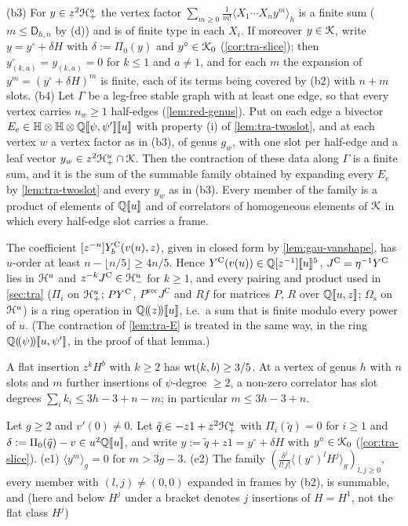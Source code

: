 \begin{lem}
\begin{description}
(b3) For $y\in z^2\mathcal{H}^u_+$ the vertex factor $\sum_{m\geq 0}\frac1{m!}\langle X_1\cdots X_ny^m\rangle_h$ is a finite sum ($m\leq\mathsf D_{h,n}$ by (d)) and is of finite type in each $X_i$. If moreover $y\in\mathcal{K}$, write $y = y^\circ+\delta H$ with $\delta := \Pi_0(y)$ and $y^\circ\in\mathcal{K}_{0}$ (\cref{cor:tra-slice}); then $y^\circ_{(k,a)} = y_{(k,a)} = 0$ for $k\leq 1$ and $a\neq 1$, and for each $m$ the expansion of $y^m = (y^\circ+\delta H)^m$ is finite, each of its terms being covered by (b2) with $n+m$ slots.
(b4) Let $\Gamma$ be a leg-free stable graph with at least one edge, so that every vertex carries $n_w\geq1$ half-edges (\cref{lem:red-genus}). Put on each edge a bivector $E_e\in\mathbb{H}\otimes\mathbb{H}\otimes\mathbb{Q}[\![ \psi,\psi' ]\!][\![ u ]\!]$ with property (i) of \cref{lem:tra-twoslot}, and at each vertex $w$ a vertex factor as in (b3), of genus $g_w$, with one slot per half-edge and a leaf vector $y_w\in z^2\mathcal{H}^u_+\cap\mathcal{K}$. Then the contraction of these data along $\Gamma$ is a finite sum, and it is the sum of the summable family obtained by expanding every $E_e$ by \cref{lem:tra-twoslot} and every $y_w$ as in (b3). Every member of the family is a product of elements of $\mathbb{Q}[\![ u ]\!]$ and of correlators of homogeneous elements of $\mathcal{K}$ in which every half-edge slot carries a frame.
\item[(c) Vanishing series; pairings] The coefficient $[z^{-n}]Y^{\mathrm{C}}_b(v(u),z)$, given in closed form by \cref{lem:gau-vanshape}, has $u$-order at least $n-\lfloor n/5\rfloor\geq 4n/5$. Hence $Y^{\mathrm{C}}(v(u))\in\mathbb{Q}[z^{-1}][\![ u ]\!]^5$, $J^{\mathrm C}=\eta^{-1}Y^{\mathrm{C}}$ lies in $\mathcal{H}^u$ and $z^{-k}J^{\mathrm C}\in\mathcal{H}^u_-$ for $k\geq 1$, and every pairing and product used in \cref{sec:tra} ($\Pi_i$ on $\mathcal{H}^u_+$; $PY^{\mathrm{C}}$, $P^{\mathrm{vec}}J^{\mathrm C}$ and $Rf$ for matrices $P$, $R$ over $\mathbb{Q}[\![ u,z ]\!]$; $\Omega_{\mathrm s}$ on $\mathcal{H}^u$) is a ring operation in $\mathbb{Q}(\!(z)\!)[\![ u ]\!]$, i.e.\ a sum that is finite modulo every power of $u$. (The contraction of \cref{lem:tra-E} is treated in the same way, in the ring $\mathbb{Q}(\!(\psi)\!)[\![ u,\psi' ]\!]$, in the proof of that lemma.)
\item[(d) Leaves] A flat insertion $z^kH^b$ with $k\geq 2$ has $\operatorname{wt}(k,b)\geq 3/5$. At a vertex of genus $h$ with $n$ slots and $m$ further insertions of $\psi$-degree $\geq 2$, a non-zero correlator has slot degrees $\sum_ik_i\leq 3h-3+n-m$; in particular $m\leq 3h-3+n$.
\item[(e) Vertex resummation] Let $g\geq 2$ and $v'(0)\neq 0$. Let $\tilde q\in -z1+z^2\mathcal{H}^u_+$ with $\Pi_i(\tilde q) = 0$ for $i\geq 1$ and $\delta := \Pi_0(\tilde q)-v\in u^2\mathbb{Q}[\![ u ]\!]$, and write $y := \tilde q+z1 = y^\circ+\delta H$ with $y^\circ\in\mathcal{K}_{0}$ (\cref{cor:tra-slice}). (e1) $\langle y^m\rangle_g = 0$ for $m>3g-3$. (e2) The family $(\frac{\delta^j}{l!\,j!}\langle(y^\circ)^lH^j\rangle_g)_{l,j\geq 0}$, every member with $(l,j)\neq(0,0)$ expanded in frames by (b2), is summable, and (here and below $H^j$ under a bracket denotes $j$ insertions of $H=H^1$, not the flat class $H^j$)

\end{description}
\end{lem}
